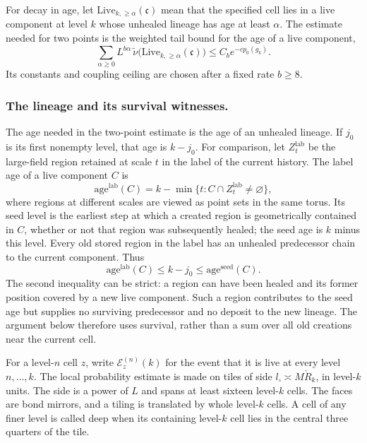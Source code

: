 \documentclass[11pt,letterpaper,reqno]{amsart}
\theoremstyle{definition}
\theoremstyle{remark}
\begin{document}
For decay in age, let
$\mathrm{Live}_{k,\ge\alpha}(\mathfrak c)$ mean that the specified cell
lies in a live component at level $k$ whose unhealed lineage has age
at least $\alpha$. The estimate needed for two points is the weighted
tail bound for the age of a live component,
\begin{equation}\label{eq:lineage-age}
 \sum_{\alpha\ge0}L^{b\alpha}\,
 \widetilde\nu\big(\mathrm{Live}_{k,\ge\alpha}(\mathfrak c)\big)
 \le C_b e^{-cp_0(g_k)}.
\end{equation}
Its constants and coupling ceiling are chosen after a fixed rate
$b\ge8$.

\subsubsection*{The lineage and its survival witnesses.}

The age needed in the two-point estimate is the age of an
unhealed lineage. If $j_0$ is its first nonempty level, that age
is $k-j_0$. For comparison, let $Z_t^{\mathrm{lab}}$ be the
large-field region retained at scale $t$ in the label of the
current history. The label age of a live component $C$ is
\[
 \mathrm{age}^{\mathrm{lab}}(C)
       =k-\min\{t:C\cap Z_t^{\mathrm{lab}}\ne\varnothing\},
\]
where regions at different scales are viewed as point sets in the
same torus. Its seed level is the earliest step at which a
created region is geometrically contained in $C$, whether or not
that region was subsequently healed; the seed age is $k$ minus
this level. Every old stored region in the label has an unhealed
predecessor chain to the current component. Thus
\[
 \mathrm{age}^{\mathrm{lab}}(C)
       \le k-j_0\le\mathrm{age}^{\mathrm{seed}}(C).
\]
The second inequality can be strict: a region can have been healed
and its former position covered by a new live component. Such a
region contributes to the seed age but supplies no surviving
predecessor and no deposit to the new lineage. The argument below
therefore uses survival, rather than a sum over all old creations
near the current cell.

For a level-$n$ cell $z$, write $\mathcal E_z^{(n)}(k)$ for the
event that it is live at every level $n,\ldots,k$. The local
probability estimate is made on tiles of side
$l_\square\asymp M\check R_k$, in level-$k$ units. The side is
a power of $L$ and spans at least sixteen level-$k$ cells. The
faces are bond mirrors, and a tiling is translated by whole
level-$k$ cells. A cell of any finer level is called deep when
its containing level-$k$ cell lies in the central three quarters
of the tile.
\end{document}
